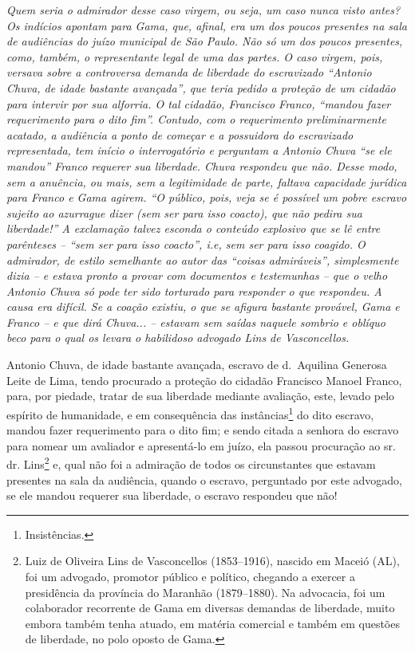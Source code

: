 {\begin{didascalia}
\emph{Quem seria o admirador desse caso virgem, ou seja, um caso nunca
visto antes? Os indícios apontam para Gama, que, afinal, era um dos
poucos presentes na sala de audiências do juízo municipal de São Paulo.
Não só um dos poucos presentes, como, também, o representante legal de
uma das partes. O caso virgem, pois, versava sobre a controversa demanda
de liberdade do escravizado ``Antonio Chuva, de idade bastante avançada'',
que teria pedido a proteção de um cidadão para intervir por sua
alforria. O tal cidadão, Francisco Franco, ``mandou fazer requerimento
para o dito fim''. Contudo, com o requerimento preliminarmente acatado, a
audiência a ponto de começar e a possuidora do escravizado representada,
tem início o interrogatório e perguntam a Antonio Chuva ``se ele mandou''
Franco requerer sua liberdade. Chuva respondeu que não. Desse modo, sem
a anuência, ou mais, sem a legitimidade de parte, faltava capacidade
jurídica para Franco e Gama agirem. ``O público, pois, veja se é possível
um pobre escravo sujeito ao azurrague dizer (sem ser para isso coacto),
que não pedira sua liberdade!'' A exclamação talvez esconda o conteúdo
explosivo que se lê entre parênteses -- ``sem ser para isso coacto'', i.e,
sem ser para isso coagido. O admirador, de estilo semelhante ao autor
das ``coisas admiráveis'', simplesmente dizia -- e estava pronto a provar
com documentos e testemunhas -- que o velho Antonio Chuva só pode ter
sido torturado para responder o que respondeu. A causa era difícil. Se a
coação existiu, o que se afigura bastante provável, Gama e Franco -- e
que dirá Chuva... -- estavam sem saídas naquele sombrio e oblíquo beco
para o qual os levara o habilidoso advogado Lins de Vasconcellos.}
\end{didascalia}

\asterisc{}

Antonio Chuva, de idade bastante avançada, escravo de d.~Aquilina
Generosa Leite de Lima, tendo procurado a proteção do cidadão Francisco
Manoel Franco, para, por piedade, tratar de sua liberdade mediante
avaliação, este, levado pelo espírito de humanidade, e em consequência
das instâncias\footnote{ Insistências.} do dito escravo, mandou fazer
requerimento para o dito fim; e sendo citada a senhora do escravo para
nomear um avaliador e apresentá-lo em juízo, ela passou procuração ao
sr. dr. Lins\footnote{ Luiz de Oliveira Lins de Vasconcellos
  (1853--1916), nascido em Maceió (AL), foi um advogado, promotor público
  e político, chegando a exercer a presidência da província do Maranhão
  (1879--1880). Na advocacia, foi um colaborador recorrente de Gama em
  diversas demandas de liberdade, muito embora também tenha atuado, em
  matéria comercial e também em questões de liberdade, no polo oposto de
  Gama.} e, qual não foi a admiração de todos os circunstantes que
estavam presentes na sala da audiência, quando o escravo, perguntado por
este advogado, se ele mandou requerer sua liberdade, o escravo respondeu
que não!

}
